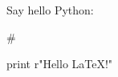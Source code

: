 \documentclass{article}
\begin{document}
Say hello Python:

\begin{python}
#

print r"Hello \LaTeX!"
\end{python}
\end{document}
